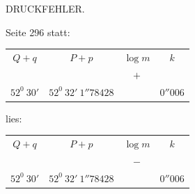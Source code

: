 \par\bigskip{}
\begin{center}\large DRUCKFEHLER.\end{center}
\par\noindent Seite 296 statt:
\begin{center}
\begin{tabular}{c|c|c|c}
\(Q+q\)&\(P+p\)&\(\log m\)&\(k\)\\
&&\(+\)&\\
\(52^{0}\ 30'\)&\(52^{0}\ 32'\ 1''78428\)&&\(0''006\)
\end{tabular}
\end{center}
\noindent lies:
\begin{center}
\begin{tabular}{c|c|c|c}
\(Q+q\)&\(P+p\)&\(\log m\)&\(k\)\\
&&\(-\)&\\
\(52^{0}\ 30'\)&\(52^{0}\ 32'\ 1''78428\)&&\(0''006\)
\end{tabular}
\end{center}
